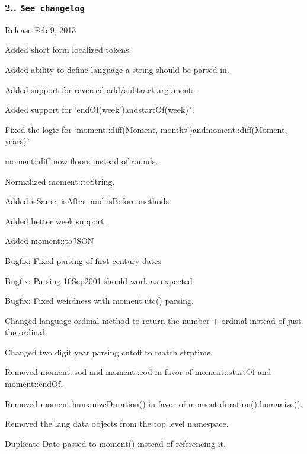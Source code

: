 \subsubsection*{2.. \href{https://gist.github.com/timrwood/e72f2eef320ed9e37c51}{\tt See changelog}}


\begin{DoxyItemize}
\item Release Feb 9, 2013
\end{DoxyItemize}

Added short form localized tokens.

Added ability to define language a string should be parsed in.

Added support for reversed add/subtract arguments.

Added support for `end\+Of(\textquotesingle{}week'){\ttfamily and}start\+Of(\textquotesingle{}week\textquotesingle{})\`{}.

Fixed the logic for `moment\+::diff(Moment, \textquotesingle{}months'){\ttfamily and}moment\+::diff(Moment, \textquotesingle{}years\textquotesingle{})\`{}

{\ttfamily moment\+::diff} now floors instead of rounds.

Normalized {\ttfamily moment\+::to\+String}.

Added {\ttfamily is\+Same}, {\ttfamily is\+After}, and {\ttfamily is\+Before} methods.

Added better week support.

Added {\ttfamily moment\+::to\+J\+S\+ON}

Bugfix\+: Fixed parsing of first century dates

Bugfix\+: Parsing 10\+Sep2001 should work as expected

Bugfix\+: Fixed weirdness with {\ttfamily moment.\+utc()} parsing.

Changed language ordinal method to return the number + ordinal instead of just the ordinal.

Changed two digit year parsing cutoff to match strptime.

Removed {\ttfamily moment\+::sod} and {\ttfamily moment\+::eod} in favor of {\ttfamily moment\+::start\+Of} and {\ttfamily moment\+::end\+Of}.

Removed {\ttfamily moment.\+humanize\+Duration()} in favor of {\ttfamily moment.\+duration().humanize()}.

Removed the lang data objects from the top level namespace.

Duplicate {\ttfamily Date} passed to {\ttfamily moment()} instead of referencing it.

